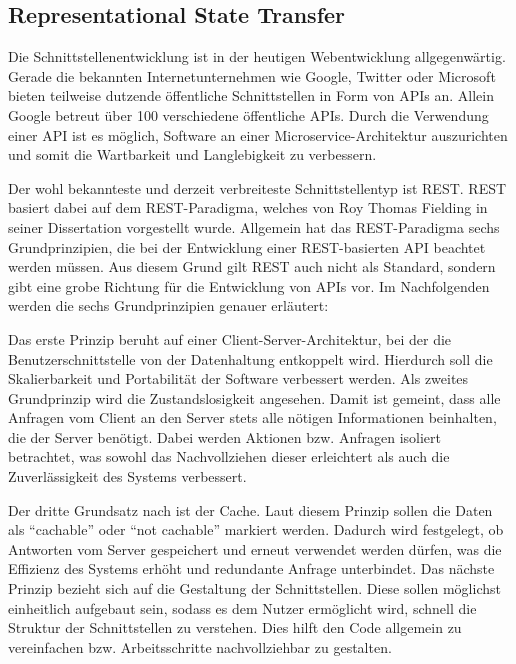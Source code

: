 \subsection{Representational State Transfer}
\label{sec:grundlagen:rest}
Die Schnittstellenentwicklung ist in der heutigen Webentwicklung allgegenwärtig.
Gerade die bekannten Internetunternehmen wie Google\autocite{MS-GoogleLLC.2020}, Twitter\autocite{MS-TwitterInc..01.03.2020} oder Microsoft\autocite{MS-MicrosoftCorporation.21.05.2018} bieten teilweise dutzende öffentliche Schnittstellen in Form von \acp{API} an.
Allein Google betreut über 100 verschiedene öffentliche \acp{API}\autocite{rf-google-api-alle}.
Durch die Verwendung einer \ac{API} ist es möglich, Software an einer Microservice-Architektur auszurichten und somit die Wartbarkeit und Langlebigkeit zu verbessern.\autocite{rf-fowler2015microservices}

Der wohl bekannteste und derzeit verbreiteste Schnittstellentyp ist \ac{REST}.
\ac{REST} basiert dabei auf dem \ac{REST}-Paradigma, welches von Roy Thomas Fielding in seiner Dissertation\autocite{MS-Fielding.} vorgestellt wurde. Allgemein hat das \ac{REST}-Paradigma sechs Grundprinzipien, die bei der Entwicklung einer \ac{REST}-basierten \ac{API} beachtet werden müssen. 
Aus diesem Grund gilt \ac{REST} auch nicht als Standard, sondern gibt eine grobe Richtung für die Entwicklung von \acp{API} vor.
Im Nachfolgenden werden die sechs Grundprinzipien genauer erläutert:

Das erste Prinzip beruht auf einer Client-Server-Architektur, bei der die Benutzerschnittstelle von der Datenhaltung entkoppelt wird. %
Hierdurch soll die Skalierbarkeit und Portabilität der Software verbessert werden.
Als zweites Grundprinzip wird die Zustandslosigkeit angesehen.
Damit ist gemeint, dass alle Anfragen vom Client an den Server stets alle nötigen Informationen beinhalten, die der Server benötigt.
Dabei werden Aktionen bzw. Anfragen isoliert betrachtet, was sowohl das Nachvollziehen dieser erleichtert als auch die Zuverlässigkeit des Systems verbessert.

Der dritte Grundsatz nach \citeauthor{MS-Fielding.} ist der Cache. 
Laut diesem Prinzip sollen die Daten als \enquote{cachable} oder \enquote{not cachable} markiert werden.
Dadurch wird festgelegt, ob Antworten vom Server gespeichert und erneut verwendet werden dürfen, was die Effizienz des Systems erhöht und redundante Anfrage unterbindet.
Das nächste Prinzip bezieht sich auf die Gestaltung der Schnittstellen. 
Diese sollen möglichst einheitlich aufgebaut sein, sodass es dem Nutzer ermöglicht wird, schnell die Struktur der Schnittstellen zu verstehen. 
Dies hilft den Code allgemein zu vereinfachen bzw. Arbeitsschritte nachvollziehbar zu gestalten.

